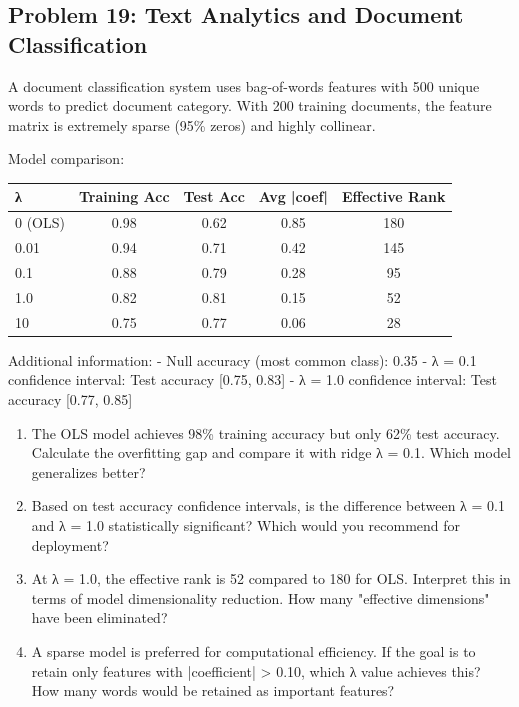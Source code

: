 \documentclass[12pt]{article}
\begin{document}
\subsection*{Problem 19: Text Analytics and Document Classification}

A document classification system uses bag-of-words features with 500 unique words to predict document category. With 200 training documents, the feature matrix is extremely sparse (95\% zeros) and highly collinear.

Model comparison:

\begin{center}
\begin{tabular}{lcccc}
\toprule
λ & Training Acc & Test Acc & Avg |coef| & Effective Rank \\
\midrule
0 (OLS) & 0.98 & 0.62 & 0.85 & 180 \\
0.01 & 0.94 & 0.71 & 0.42 & 145 \\
0.1 & 0.88 & 0.79 & 0.28 & 95 \\
1.0 & 0.82 & 0.81 & 0.15 & 52 \\
10 & 0.75 & 0.77 & 0.06 & 28 \\
\bottomrule
\end{tabular}
\end{center}

Additional information:
- Null accuracy (most common class): 0.35
- λ = 0.1 confidence interval: Test accuracy [0.75, 0.83]
- λ = 1.0 confidence interval: Test accuracy [0.77, 0.85]

\begin{enumerate}[label=(\alph*)]
\item The OLS model achieves 98\% training accuracy but only 62\% test accuracy. Calculate the overfitting gap and compare it with ridge λ = 0.1. Which model generalizes better?

\item Based on test accuracy confidence intervals, is the difference between λ = 0.1 and λ = 1.0 statistically significant? Which would you recommend for deployment?

\item At λ = 1.0, the effective rank is 52 compared to 180 for OLS. Interpret this in terms of model dimensionality reduction. How many "effective dimensions" have been eliminated?

\item A sparse model is preferred for computational efficiency. If the goal is to retain only features with |coefficient| > 0.10, which λ value achieves this? How many words would be retained as important features?
\end{enumerate}
\end{document}
